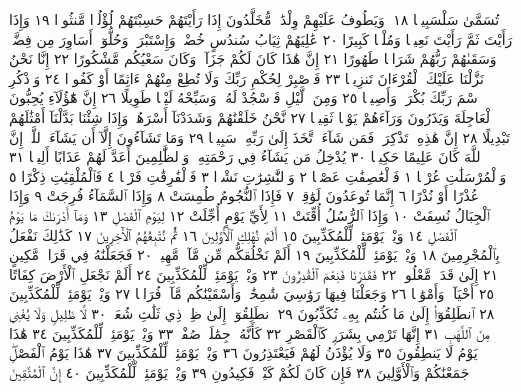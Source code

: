 تُسَمَّىٰ سَلْسَبِيلࣰا ١٨۞ وَيَطُوفُ عَلَيْهِمْ وِلْدَٰنࣱ مُّخَلَّدُونَ إِذَا رَأَيْتَهُمْ حَسِبْتَهُمْ
لُؤْلُؤࣰا مَّنثُورࣰا ١٩ وَإِذَا رَأَيْتَ ثَمَّ رَأَيْتَ نَعِيمࣰا وَمُلْكࣰا كَبِيرًا ٢٠ عَٰلِيَهُمْ ثِيَابُ
سُندُسٍ خُضْرࣱ وَإِسْتَبْرَقࣱۖ وَحُلُّوٓا۟ أَسَاوِرَ مِن فِضَّةࣲ وَسَقَىٰهُمْ رَبُّهُمْ
شَرَابࣰا طَهُورًا ٢١ إِنَّ هَٰذَا كَانَ لَكُمْ جَزَآءࣰ وَكَانَ سَعْيُكُم مَّشْكُورًا ٢٢
إِنَّا نَحْنُ نَزَّلْنَا عَلَيْكَ ٱلْقُرْءَانَ تَنزِيلࣰا ٢٣ فَٱصْبِرْ لِحُكْمِ رَبِّكَ وَلَا تُطِعْ
مِنْهُمْ ءَاثِمًا أَوْ كَفُورࣰا ٢٤ وَٱذْكُرِ ٱسْمَ رَبِّكَ بُكْرَةࣰ وَأَصِيلࣰا ٢٥
وَمِنَ ٱلَّيْلِ فَٱسْجُدْ لَهُۥ وَسَبِّحْهُ لَيْلࣰا طَوِيلًا ٢٦ إِنَّ هَٰٓؤُلَآءِ
يُحِبُّونَ ٱلْعَاجِلَةَ وَيَذَرُونَ وَرَآءَهُمْ يَوْمࣰا ثَقِيلࣰا ٢٧ نَّحْنُ خَلَقْنَٰهُمْ
وَشَدَدْنَآ أَسْرَهُمْۖ وَإِذَا شِئْنَا بَدَّلْنَآ أَمْثَٰلَهُمْ تَبْدِيلًا ٢٨ إِنَّ
هَٰذِهِۦ تَذْكِرَةࣱۖ فَمَن شَآءَ ٱتَّخَذَ إِلَىٰ رَبِّهِۦ سَبِيلࣰا ٢٩ وَمَا تَشَآءُونَ
إِلَّآ أَن يَشَآءَ ٱللَّهُۚ إِنَّ ٱللَّهَ كَانَ عَلِيمًا حَكِيمࣰا ٣٠ يُدْخِلُ
مَن يَشَآءُ فِي رَحْمَتِهِۦۚ وَٱلظَّٰلِمِينَ أَعَدَّ لَهُمْ عَذَابًا أَلِيمَۢا ٣١
وَٱلْمُرْسَلَٰتِ عُرْفࣰا ١ فَٱلْعَٰصِفَٰتِ عَصْفࣰا ٢ وَٱلنَّٰشِرَٰتِ نَشْرࣰا ٣
فَٱلْفَٰرِقَٰتِ فَرْقࣰا ٤ فَٱلْمُلْقِيَٰتِ ذِكْرًا ٥ عُذْرًا أَوْ نُذْرًا ٦ إِنَّمَا
تُوعَدُونَ لَوَٰقِعࣱ ٧ فَإِذَا ٱلنُّجُومُ طُمِسَتْ ٨ وَإِذَا ٱلسَّمَآءُ فُرِجَتْ ٩
وَإِذَا ٱلْجِبَالُ نُسِفَتْ ١٠ وَإِذَا ٱلرُّسُلُ أُقِّتَتْ ١١ لِأَيِّ يَوْمٍ أُجِّلَتْ ١٢
لِيَوْمِ ٱلْفَصْلِ ١٣ وَمَآ أَدْرَىٰكَ مَا يَوْمُ ٱلْفَصْلِ ١٤ وَيْلࣱ يَوْمَئِذࣲ
لِّلْمُكَذِّبِينَ ١٥ أَلَمْ نُهْلِكِ ٱلْأَوَّلِينَ ١٦ ثُمَّ نُتْبِعُهُمُ ٱلْأٓخِرِينَ ١٧
كَذَٰلِكَ نَفْعَلُ بِٱلْمُجْرِمِينَ ١٨ وَيْلࣱ يَوْمَئِذࣲ لِّلْمُكَذِّبِينَ ١٩
أَلَمْ نَخْلُقكُّم مِّن مَّآءࣲ مَّهِينࣲ ٢٠ فَجَعَلْنَٰهُ فِي قَرَارࣲ مَّكِينٍ ٢١ إِلَىٰ قَدَرࣲ
مَّعْلُومࣲ ٢٢ فَقَدَرْنَا فَنِعْمَ ٱلْقَٰدِرُونَ ٢٣ وَيْلࣱ يَوْمَئِذࣲ لِّلْمُكَذِّبِينَ ٢٤
أَلَمْ نَجْعَلِ ٱلْأَرْضَ كِفَاتًا ٢٥ أَحْيَآءࣰ وَأَمْوَٰتࣰا ٢٦ وَجَعَلْنَا فِيهَا رَوَٰسِيَ
شَٰمِخَٰتࣲ وَأَسْقَيْنَٰكُم مَّآءࣰ فُرَاتࣰا ٢٧ وَيْلࣱ يَوْمَئِذࣲ لِّلْمُكَذِّبِينَ ٢٨
ٱنطَلِقُوٓا۟ إِلَىٰ مَا كُنتُم بِهِۦ تُكَذِّبُونَ ٢٩ ٱنطَلِقُوٓا۟ إِلَىٰ ظِلࣲّ ذِي ثَلَٰثِ
شُعَبࣲ ٣٠ لَّا ظَلِيلࣲ وَلَا يُغْنِي مِنَ ٱللَّهَبِ ٣١ إِنَّهَا تَرْمِي بِشَرَرࣲ
كَٱلْقَصْرِ ٣٢ كَأَنَّهُۥ جِمَٰلَتࣱ صُفْرࣱ ٣٣ وَيْلࣱ يَوْمَئِذࣲ لِّلْمُكَذِّبِينَ ٣٤
هَٰذَا يَوْمُ لَا يَنطِقُونَ ٣٥ وَلَا يُؤْذَنُ لَهُمْ فَيَعْتَذِرُونَ ٣٦ وَيْلࣱ يَوْمَئِذࣲ
لِّلْمُكَذِّبِينَ ٣٧ هَٰذَا يَوْمُ ٱلْفَصْلِۖ جَمَعْنَٰكُمْ وَٱلْأَوَّلِينَ ٣٨ فَإِن كَانَ
لَكُمْ كَيْدࣱ فَكِيدُونِ ٣٩ وَيْلࣱ يَوْمَئِذࣲ لِّلْمُكَذِّبِينَ ٤٠ إِنَّ ٱلْمُتَّقِينَ
